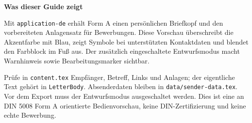 
\UseIconstrue
\SetColorBlue
\UseHeaderColorBlocktrue
\UseFooterColorBlockfalse

\DraftModetrue


\begin{LetterBody}




\textbf{Was dieser Guide zeigt}

Mit \texttt{application-de} erhält Form A einen persönlichen Briefkopf und den vorbereiteten Anlagensatz für Bewerbungen. Diese Vorschau überschreibt die Akzentfarbe mit Blau, zeigt Symbole bei unterstützten Kontaktdaten und blendet den Farbblock im Fuß aus. Der zusätzlich eingeschaltete Entwurfsmodus macht Warnhinweis sowie Bearbeitungsmarker sichtbar.

Prüfe in \texttt{content.tex} Empfänger, Betreff, Links und Anlagen; der eigentliche Text gehört in \texttt{LetterBody}. Absenderdaten bleiben in \texttt{data/sender-data.tex}. Vor dem Export muss der Entwurfsmodus ausgeschaltet werden. Dies ist eine an DIN 5008 Form A orientierte Bedienvorschau, keine DIN-Zertifizierung und keine echte Bewerbung.

\end{LetterBody}
